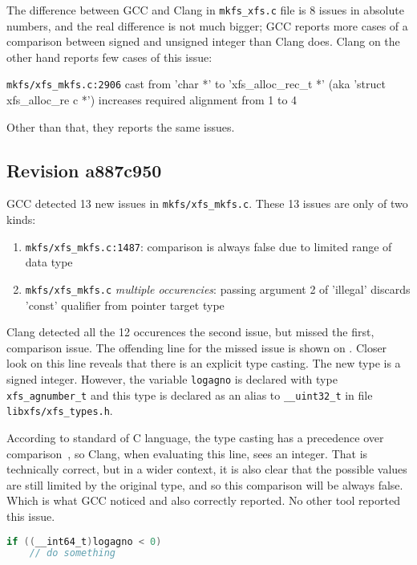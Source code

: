 The difference between GCC and Clang in {\tt mkfs\_xfs.c} file is 8 issues in
absolute numbers, and the real difference is not much bigger; GCC reports more cases of a comparison between signed and unsigned integer than Clang does. Clang on the other hand reports few cases of this issue:

{\tt mkfs/xfs\_mkfs.c:2906} cast from 'char *' to 'xfs\_alloc\_rec\_t *' (aka 'struct xfs\_alloc\_re    c *') increases required alignment from 1 to 4

Other than that, they reports the same issues.

\subsection{Revision a887c950}\label{chap:results:gcc:a887c950}
GCC detected 13 new issues in {\tt mkfs/xfs\_mkfs.c}. These 13 issues are only of two
kinds:
\begin{enumerate}
	\item {\tt mkfs/xfs\_mkfs.c:1487}: comparison is always false due
		to limited range of data type
	\item {\tt mkfs/xfs\_mkfs.c} {\em multiple occurencies}: passing
		argument 2 of 'illegal' discards 'const' qualifier from
		pointer target type
\end{enumerate}

Clang detected all the 12 occurences the second issue, but missed the first,
comparison issue. The offending line for the missed issue is shown on
. Closer look on this line reveals that
there is an explicit type casting. The new type is a signed integer. However,
the variable {\tt logagno} is declared with type {\tt xfs\_agnumber\_t} and
this type is declared as an alias to {\tt \_\_uint32\_t} in file {\tt
libxfs/xfs\_types.h}.

According to standard of C language, the type casting has a precedence over
comparison~\cite[A.2.1]{ISO9899}, so Clang, when evaluating this line, sees
an integer. That is technically correct, but in a wider context, it is also
clear that the possible values are still limited by the original type, and
so this comparison will be always false.  Which is what GCC noticed and
also correctly reported. No other tool reported this issue.


\begin{lstlisting}[frame=none, basicstyle=\footnotesize\ttfamily,
language=C, numbers=none, numberstyle=\tiny\color{black},caption=
{Line on which GCC found the comparison issue.},
label={lst:results:logagnoComparison}]
if ((__int64_t)logagno < 0)
	// do something
\end{lstlisting}

